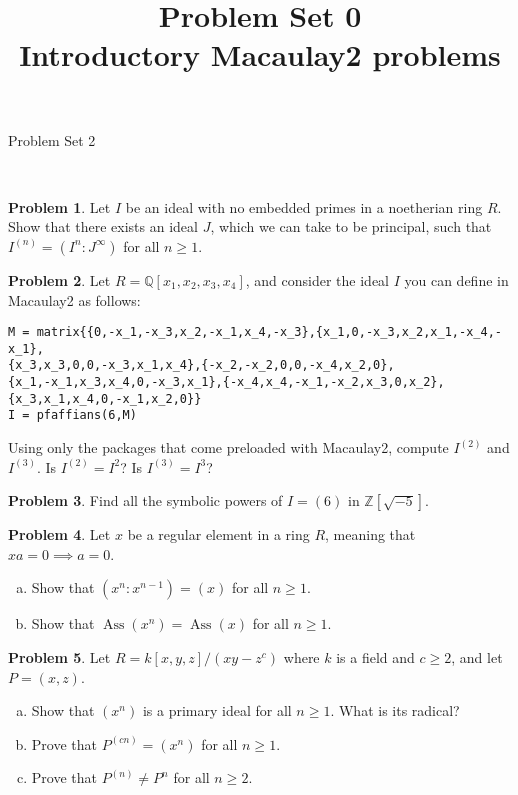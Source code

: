 \documentclass[11pt]{article}
\title{}
\date{\vspace{-0.5in}}
\title{Problem Set 0 \\ Introductory Macaulay2 problems}
\DeclareMathOperator{\Ass}{Ass}
\theoremstyle{definition}
\newtheorem{problem}{Problem}
\begin{document}
\thispagestyle{fancy}
\pagestyle{fancy}


\begin{center}
	{\LARGE Problem Set 2\\
	
	
}
\end{center}

\


\begin{problem}
		Let $I$ be an ideal with no embedded primes in a noetherian ring $R$. Show that there exists an ideal $J$, which we can take to be principal, such that $I^{(n)} = (I^n : J^\infty)$ for all $n \geqslant 1$.
\end{problem}




\begin{problem}
Let $R = \mathbb{Q}[x_1, x_2, x_3, x_4]$, and consider the ideal $I$ you can define in Macaulay2 as follows:
\begin{verbatim}
M = matrix{{0,-x_1,-x_3,x_2,-x_1,x_4,-x_3},{x_1,0,-x_3,x_2,x_1,-x_4,-x_1},
{x_3,x_3,0,0,-x_3,x_1,x_4},{-x_2,-x_2,0,0,-x_4,x_2,0},
{x_1,-x_1,x_3,x_4,0,-x_3,x_1},{-x_4,x_4,-x_1,-x_2,x_3,0,x_2},{x_3,x_1,x_4,0,-x_1,x_2,0}}
I = pfaffians(6,M)
\end{verbatim}
Using only the packages that come preloaded with Macaulay2, compute $I^{(2)}$ and $I^{(3)}$. Is $I^{(2)} = I^2$? Is $I^{(3)} = I^3$?
\end{problem}

\begin{problem}
	Find all the symbolic powers of $I = (6)$ in $\mathbb{Z}[\sqrt{-5}]$. 
\end{problem}


\begin{problem}
	Let $x$ be a regular element in a ring $R$, meaning that $xa = 0 \implies a = 0$. 
	\begin{enumerate}[a)]
		\item Show that $(x^n : x^{n-1}) = (x)$ for all $n \geqslant 1$.
		\item Show that $\Ass(x^n) = \Ass(x)$ for all $n \geqslant 1$.
	\end{enumerate}	
\end{problem}


\begin{problem}
	Let $R = k[x,y,z]/(xy-z^c)$ where $k$ is a field and $c \geqslant 2$, and let $P = (x,z)$.
	\begin{enumerate}[a)]
		\item Show that $(x^n)$ is a primary ideal for all $n \geqslant 1$. What is its radical?
		\item Prove that $P^{(cn)} = (x^n)$ for all $n \geqslant 1$.
		\item Prove that $P^{(n)} \neq P^n$ for all $n \geqslant 2$.
	\end{enumerate}
\end{problem}
\end{document}
